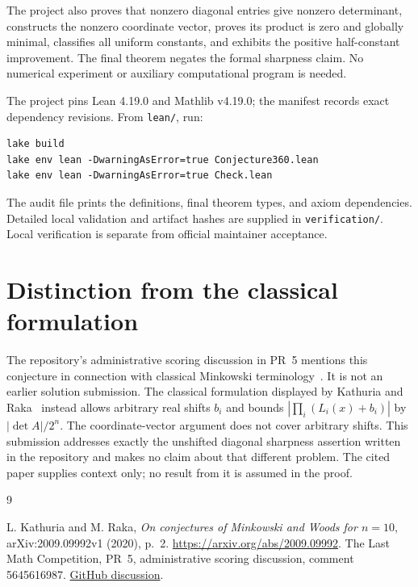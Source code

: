 \documentclass[11pt]{article}
\begin{document}
The project also proves that nonzero diagonal entries give nonzero determinant, constructs the nonzero coordinate vector, proves its product is zero and globally minimal, classifies all uniform constants, and exhibits the positive half-constant improvement. The final theorem negates the formal sharpness claim. No numerical experiment or auxiliary computational program is needed.

The project pins Lean 4.19.0 and Mathlib v4.19.0; the manifest records exact dependency revisions. From \texttt{lean/}, run:
\begin{verbatim}
lake build
lake env lean -DwarningAsError=true Conjecture360.lean
lake env lean -DwarningAsError=true Check.lean
\end{verbatim}
The audit file prints the definitions, final theorem types, and axiom dependencies. Detailed local validation and artifact hashes are supplied in \texttt{verification/}. Local verification is separate from official maintainer acceptance.

\section{Distinction from the classical formulation}
The repository's administrative scoring discussion in PR~5 mentions this conjecture in connection with classical Minkowski terminology~\cite{scoring}. It is not an earlier solution submission. The classical formulation displayed by Kathuria and Raka~\cite[p.~2]{kr} instead allows arbitrary real shifts $b_i$ and bounds $|\prod_i(L_i(x)+b_i)|$ by $|\det A|/2^n$. The coordinate-vector argument does not cover arbitrary shifts. This submission addresses exactly the unshifted diagonal sharpness assertion written in the repository and makes no claim about that different problem. The cited paper supplies context only; no result from it is assumed in the proof.

\begin{thebibliography}{9}
\raggedright
{} L. Kathuria and M. Raka, \emph{On conjectures of Minkowski and Woods for $n=10$}, arXiv:2009.09992v1 (2020), p.~2. \url{https://arxiv.org/abs/2009.09992}.
 The Last Math Competition, PR~5, administrative scoring discussion, comment 5645616987. \href{https://github.com/The-Last-Math-Competition/The-Last-Math-Competition/pull/5#issuecomment-5645616987}{GitHub discussion}.
\end{thebibliography}
\end{document}
